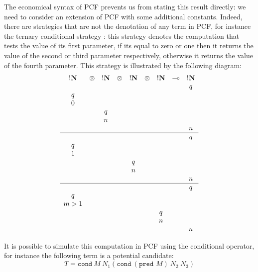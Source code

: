 The economical syntax of PCF prevents us from stating this
result directly: we need to consider an extension of PCF with some additional
constants. Indeed, there are strategies that are not the denotation of any term
in PCF, for instance the ternary conditional strategy : this
strategy denotes the computation that tests the value of its first
parameter, if its equal to zero or one then it returns the value of
the second or third parameter respectively, otherwise it returns the
value of the fourth parameter. This strategy is illustrated by the
following diagram:
$$
\begin{array}{ccccccccc}
!\bf N & \otimes & !\bf N & \otimes & !\bf N & \otimes & !\bf N & \multimap & !\bf N \\
&&&&&&&&q \\
q \\
0 \\
&& q \\
&& n \\
&&&&&&&&n \\
\hline
&&&&&&&&q \\
q \\
1 \\
&&&& q \\
&&&& n \\
&&&&&&&&n \\
\hline
&&&&&&&&q \\
q \\
m>1 \\
&&&&&& q \\
&&&&&& n \\
&&&&&&&&n \\
\end{array}
$$

It is possible to simulate this computation in PCF using the conditional operator, for instance the following term is a potential candidate:
$$ T = \texttt{cond}\ M\  N_1 (\texttt{cond}\  (\texttt{pred } M)\  N_2\  N_3)$$

